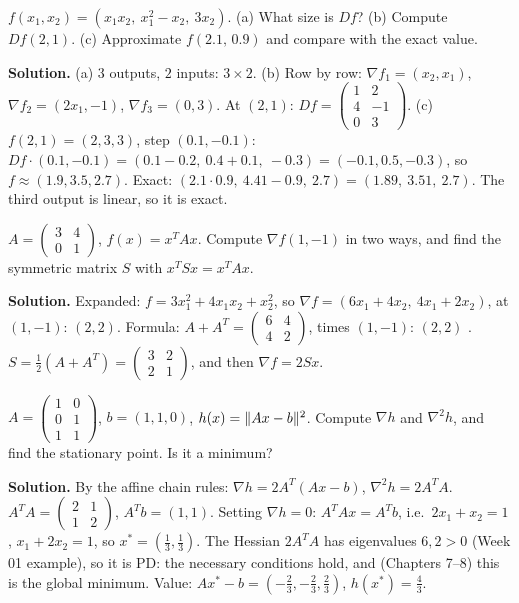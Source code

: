 \begin{example}
$f(x_1,x_2) = (x_1x_2,\ x_1^2-x_2,\ 3x_2)$. (a) What size is $Df$? (b) Compute $Df(2,1)$. (c) Approximate $f(2.1,\,0.9)$ and compare with the exact value.

\textbf{Solution.} (a) $3$ outputs, $2$ inputs: $3\times2$.
(b) Row by row: $\nabla f_1 = (x_2,x_1)$, $\nabla f_2 = (2x_1,-1)$, $\nabla f_3 = (0,3)$. At $(2,1)$:
$Df=\begin{pmatrix}1&2\\4&-1\\0&3\end{pmatrix}$.
(c) $f(2,1)=(2,3,3)$, step $(0.1,-0.1)$: $Df\cdot(0.1,-0.1) = (0.1-0.2,\ 0.4+0.1,\ -0.3) = (-0.1,0.5,-0.3)$, so $f\approx(1.9,3.5,2.7)$.
Exact: $(2.1\cdot0.9,\ 4.41-0.9,\ 2.7) = (1.89,\ 3.51,\ 2.7)$. The third output is linear, so it is exact.
\end{example}

\begin{example}
$A=\begin{pmatrix}3&4\\0&1\end{pmatrix}$, $f(x)=x^TAx$. Compute $\nabla f(1,-1)$ in two ways, and find the symmetric matrix $S$ with $x^TSx=x^TAx$.

\textbf{Solution.} Expanded: $f=3x_1^2+4x_1x_2+x_2^2$, so $\nabla f=(6x_1+4x_2,\ 4x_1+2x_2)$, at $(1,-1)$: $(2,2)$.
Formula: $A+A^T=\begin{pmatrix}6&4\\4&2\end{pmatrix}$, times $(1,-1)$: $(2,2)$ \checkmark.
$S=\tfrac12(A+A^T)=\begin{pmatrix}3&2\\2&1\end{pmatrix}$, and then $\nabla f = 2Sx$.
\end{example}

\begin{example}
$A=\begin{pmatrix}1&0\\0&1\\1&1\end{pmatrix}$, $b=(1,1,0)$, $h(x)=\lVert Ax-b\rVert^2$. Compute $\nabla h$ and $\nabla^2h$, and find the stationary point. Is it a minimum?

\textbf{Solution.} By the affine chain rules: $\nabla h=2A^T(Ax-b)$, $\nabla^2h=2A^TA$.
$A^TA=\begin{pmatrix}2&1\\1&2\end{pmatrix}$, $A^Tb=(1,1)$. Setting $\nabla h=0$: $A^TAx=A^Tb$, i.e.\ $2x_1+x_2=1$, $x_1+2x_2=1$, so $x^*=(\tfrac13,\tfrac13)$.
The Hessian $2A^TA$ has eigenvalues $6,2>0$ (Week 01 example), so it is PD: the necessary conditions hold, and (Chapters 7--8) this is the global minimum.
Value: $Ax^*-b = (-\tfrac23,-\tfrac23,\tfrac23)$, $h(x^*)=\tfrac43$.
\end{example}


